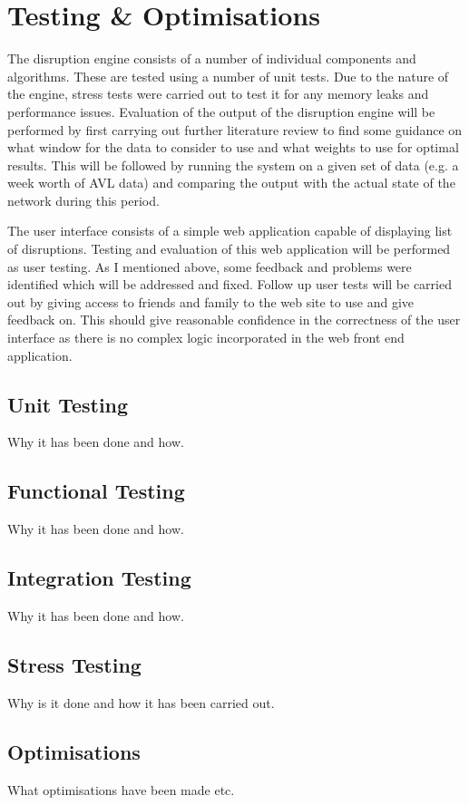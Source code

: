 \chapter{Testing \& Optimisations}

The disruption engine consists of a number of individual components and algorithms.
These are tested using a number of unit tests. Due to the nature of
the engine, stress tests were carried out to test it for any memory leaks and
performance issues. Evaluation of the output of the disruption engine will be
performed by first carrying out further literature review to find some guidance
on what window for the data to consider to use and what weights to use for
optimal results. This will be followed by running the system on a given set
of data (e.g. a week worth of AVL data) and comparing the output with the
actual state of the network during this period.

The user interface consists of a simple web application capable of displaying
list of disruptions. Testing and evaluation of this web application will be
performed as user testing. As I mentioned above, some feedback and problems
were identified which will be addressed and fixed. Follow up user tests will be
carried out by giving access to friends and family to the web site to use and
give feedback on. This should give reasonable confidence in the correctness of
the user interface as there is no complex logic incorporated in the web front
end application.
\section{Unit Testing}
Why it has been done and how.

\section{Functional Testing}
Why it has been done and how.

\section{Integration Testing}
Why it has been done and how.

\section{Stress Testing}
Why is it done and how it has been carried out.

\section{Optimisations}
What optimisations have been made etc.